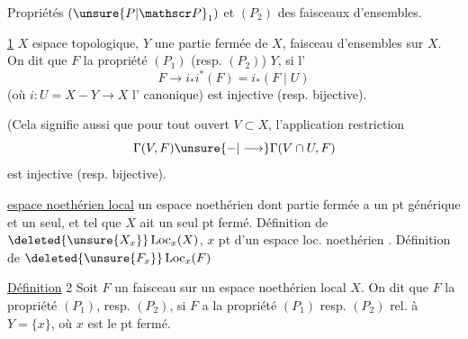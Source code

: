 Propriétés $(\unsure{P|\mathscr P}_1)$ et $(P_2)$  des faisceaux d'ensembles.


\uline{ 1}  $X$ espace topologique, $Y$ une partie fermée
de $X$,  faisceau d'ensembles sur $X$. On dit
que $F$  la propriété $(P_1)$ (resp. $(P_2)$)
  $Y$, si l' 
\[
F\longrightarrow i_*i^*(F)=i_*(F\mid U)
\]
(où $i:U=X-Y\longrightarrow X$  l' canonique)
est injective (resp. bijective).

(Cela signifie  aussi que
pour tout ouvert $V\subset X$, l'application  restriction
\[
\Gamma(V,F)\unsure{-|\longrightarrow}\Gamma(V\cap U,F)
\]
est injective (resp. bijective).

 \uline{espace noethérien local} un espace
noethérien dont  partie fermée  a un
pt générique et un seul, et tel que $X$ ait un
seul pt fermé. Définition de $\deleted{\unsure{X_x}}\operatorname{Loc}_x(X)$, $x$ pt d'un
espace loc. noethérien . Définition de $\deleted{\unsure{F_x}}\operatorname{Loc}_x(F)$

\uline{Définition} 2 Soit $F$ un faisceau sur un espace
noethérien local $X$. On dit que $F$  la
propriété $(P_1)$, resp. $(P_2)$, si  $F$ a la propriété
$(P_1)$ resp. $(P_2)$ rel. à $Y=\{x\}$, où $x$ est le pt fermé.

